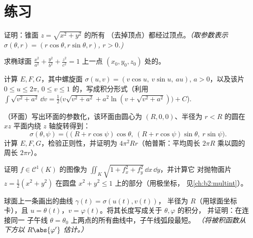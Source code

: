 \section{练习}

\begin{exercise}[$\star$]\label{exo:b2:surfaces:1}
证明：锥面 $z = \sqrt{x^2 + y^2}$ 的所有
（去掉顶点）都经过顶点。\emph{（取参数表示
$\sigma(\theta, r) = (r\cos\theta, r\sin\theta, r)$, $r > 0$.)}
\end{exercise}

\begin{exercise}[$\star$]\label{exo:b2:surfaces:2}
求椭球面 $\frac{x^2}{a^2} +
\frac{y^2}{b^2} + \frac{z^2}{c^2} = 1$ 上一点 $(x_0, y_0,
z_0)$ 处的。
\end{exercise}

\begin{exercise}[$\star$]\label{exo:b2:surfaces:3}
计算 $E, F, G$，其中螺旋面 $\sigma(u, v) = (v\cos u,\
v\sin u,\ au)$, $a > 0$，以及该片 $0 \leq u \leq
2\pi$, $0 \leq v \leq 1$ 的，写成积分形式（利用
$\int\sqrt{v^2 + a^2}\,\dd v = \frac12\bigl(v\sqrt{v^2+a^2} +
a^2\ln(v + \sqrt{v^2 + a^2})\bigr) + C$).
\end{exercise}

\begin{exercise}[$\star\star$]\label{exo:b2:surfaces:4}
（环面）写出环面的参数化，该环面由圆心为
$(R, 0, 0)$、半径为 $r < R$ 的圆在 $xz$ 平面内绕
$z$ 轴旋转得到：
\[
\sigma(\theta, \psi) = \bigl((R + r\cos\psi)\cos\theta,\
(R + r\cos\psi)\sin\theta,\ r\sin\psi\bigr).
\]
计算 $E, F, G$，检验正则性，并证明为
$4\pi^2 R r$（帕普斯：平均周长 $2\pi R$ 乘以圆的
周长 $2\pi r$）。
\end{exercise}

\begin{exercise}[$\star\star$]\label{exo:b2:surfaces:5}
证明 $f \in \mathcal{C}^1(K)$ 的图像为
$\iint_K \sqrt{1 + f_x^2 + f_y^2}\,\dd x\,\dd y$，并计算它
对抛物面片 $z = \frac12(x^2 + y^2)$ 在圆盘
$x^2 + y^2 \leq 1$ 上的部分（用极坐标，
见\cref{ch:b2:multint}）。
\end{exercise}

\begin{exercise}[$\star\star$]\label{exo:b2:surfaces:6}
球面上一条画出的曲线 $\gamma(t) = \sigma(u(t), v(t))$，
半径为 $R$（用球面坐标卡），且 $u = \theta(t)$，$v =
\varphi(t)$。将其长度写成关于 $\theta, \varphi$ 的积分，
并证明：在连接同一
子午线 $\theta = \theta_0$ 上两点的所有曲线中，子午线弧段最短。
\emph{（将被积函数从下方以 $R\abs{\varphi'}$ 估计。）}
\end{exercise}

